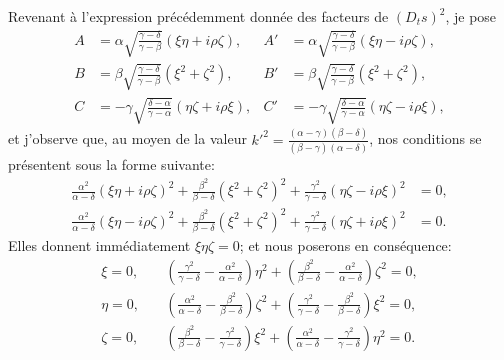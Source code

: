\documentclass[11pt,leqno,oneside,letterpaper]{book}[2005/09/16]
\begin{document}
Revenant \`a l'expression pr\'ec\'edemment donn\'ee des facteurs de $(D_t s)^2$,
je pose
\begin{align*}
   A &= \alpha\sqrt{ \tfrac{\gamma-\delta}{\gamma-\beta } }(\xi\eta + i\rho\zeta),
& A'&= \alpha\sqrt{ \tfrac{\gamma-\delta}{\gamma-\beta } }(\xi\eta - i\rho\zeta), \\
   B &= \beta \sqrt{ \tfrac{\gamma-\delta}{\gamma-\beta } }(\xi^2  + \zeta^2),
& B'&= \beta \sqrt{ \tfrac{\gamma-\delta}{\gamma-\beta } }(\xi^2  + \zeta^2), \\
   C &=-\gamma\sqrt{ \tfrac{\delta-\alpha}{\gamma-\alpha} }(\eta\zeta + i\rho\xi),
& C'&=-\gamma\sqrt{ \tfrac{\delta-\alpha}{\gamma-\alpha} }(\eta\zeta - i\rho\xi),
\end{align*}
et j'observe que, au moyen de la valeur
$k'^2 = \frac{(\alpha-\gamma)(\beta -\delta)}{(\beta -\gamma)(\alpha-\delta)}$,
nos conditions se pr\'esentent sous la forme suivante:
\begin{align*}
  \frac{\alpha^2}{\alpha-\delta} (\xi\eta   + i\rho\zeta)^2
+ \frac{ \beta^2}{ \beta-\delta} (\xi^2     + \zeta^2   )^2
+ \frac{\gamma^2}{\gamma-\delta} (\eta\zeta - i\rho\xi  )^2 &= 0,
\\
  \frac{\alpha^2}{\alpha-\delta} (\xi\eta   - i\rho\zeta)^2
+ \frac{ \beta^2}{ \beta-\delta} (\xi^2     + \zeta^2   )^2
+ \frac{\gamma^2}{\gamma-\delta} (\eta\zeta + i\rho\xi  )^2 &= 0.
\end{align*}
Elles donnent imm\'ediatement $\xi\eta\zeta = 0$; et nous poserons en cons\'equence:
\begin{align*}
\tag*{\primo}
  \xi   = 0, & \quad
  \left( \frac{\gamma^2}{\gamma-\delta}
       - \frac{\alpha^2}{\alpha-\delta} \right)\eta^2
+ \left( \frac{ \beta^2}{ \beta-\delta}
       - \frac{\alpha^2}{\alpha-\delta} \right)\zeta^2 = 0,
\\
\tag*{\secundo}
  \eta  = 0, & \quad
  \left( \frac{\alpha^2}{\alpha-\delta}
       - \frac{ \beta^2}{ \beta-\delta} \right)\zeta^2
+ \left( \frac{\gamma^2}{\gamma-\delta}
       - \frac{ \beta^2}{ \beta-\delta} \right)\xi^2 = 0,
\\
\tag*{\tertio}
  \zeta = 0, & \quad
  \left( \frac{ \beta^2}{ \beta-\delta}
       - \frac{\gamma^2}{\gamma-\delta} \right)\xi^2
+ \left( \frac{\alpha^2}{\alpha-\delta}
       - \frac{\gamma^2}{\gamma-\delta} \right)\eta^2 = 0.
\end{align*}
\medskip
\end{document}
